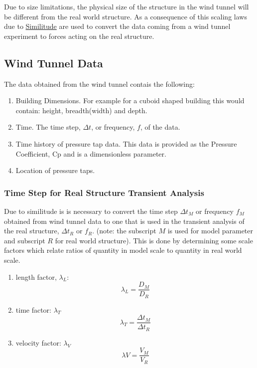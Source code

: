 Due to size limitations, the physical size of the structure in the wind tunnel will be different from the real world structure. As a consequence of this scaling laws due to \href{https://en.wikipedia.org/wiki/Similitude_(model)}{Similitude} are used to convert the data coming from a wind tunnel experiment to forces acting on the real structure. 

\subsection{Wind Tunnel Data}
The data obtained from the wind tunnel contais the following:
\begin{enumerate}
\item Building Dimensions. For example for a cuboid shaped building this would contain: height, breadth(width) and depth.
\item Time. The time step, $\Delta t$, or frequency, $f$, of the data.
\item Time history of pressure tap data. This data is provided as the Pressure Coefficient, Cp and is a dimensionless parameter.
\item Location of pressure taps.
\end{enumerate}


\subsubsection{Time Step for Real Structure Transient Analysis}
Due to similitude is is necessary to convert the time step $\Delta t_M$ or frequency $f_M$ obtained from wind tunnel data to one that is used in the transient analysis of the real structure, $\Delta t_R$ or $f_R$. (note: the subscript $M$ is used for model parameter and subscript $R$ for real world structure). This is done by determining some scale factors which relate ratios of quantity in model scale to quantity in real world scale.

\begin{enumerate}
\item length factor, $\lambda_L$:
\[ 
\lambda_L = \frac{D_M}{D_R} 
\]

\item time factor: $\lambda_T $
\[
\lambda_T= \frac{\Delta t_M}{\Delta t_R}
\]

\item velocity factor: $\lambda_V$
\[
\lambda V= \frac{V_M}{V_R}
\]

\end{enumerate}

